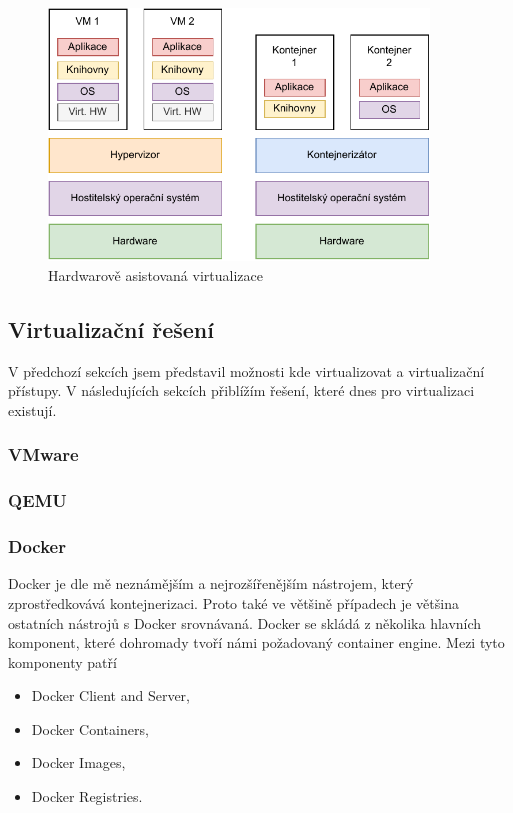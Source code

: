 \begin{figure}[htbp]
    \centering 
    \includegraphics[width=0.9\textwidth]{assets/img/containerization.pdf}
    \caption{Hardwarově asistovaná virtualizace}
    \label{fig:containerization}
\end{figure}


\subsection{Virtualizační řešení}

V předchozí sekcích jsem představil možnosti kde virtualizovat a virtualizační přístupy. V následujících sekcích přiblížím řešení, které dnes pro virtualizaci existují.


\subsubsection{VMware}

\subsubsection{QEMU}

\subsubsection{Docker} 
Docker je dle mě neznámějším a nejrozšířenějším nástrojem, který zprostředkovává kontejnerizaci. Proto také ve většině případech je většina ostatních nástrojů s Docker srovnávaná. Docker se skládá z několika hlavních komponent, které dohromady tvoří námi požadovaný container engine. Mezi tyto komponenty patří

\begin{itemize}
    \item Docker Client and Server,
    \item Docker Containers,
    \item Docker Images,
    \item Docker Registries.
\end{itemize}

